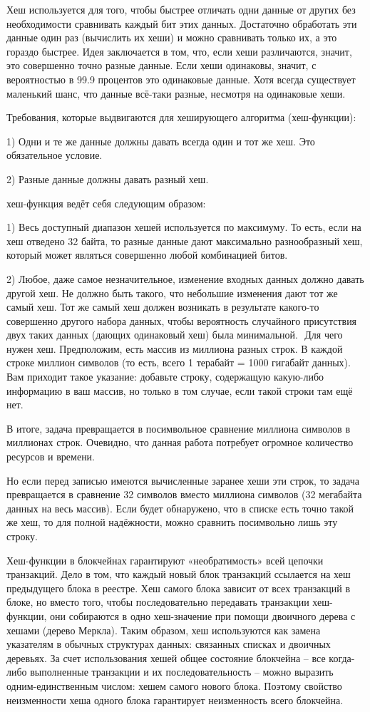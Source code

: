 \documentclass[och, master, nir]{SCWorks_fix}
\theoremstyle{plain}
\theoremstyle{plain}
\theoremstyle{plain}
\theoremstyle{definition}
\begin{document}
Хеш используется для того, чтобы быстрее отличать одни данные от других без необходимости сравнивать каждый бит этих данных. Достаточно обработать эти данные один раз (вычислить их хеши) и можно сравнивать только их, а это гораздо быстрее. Идея заключается в том, что, если хеши различаются, значит, это совершенно точно разные данные. Если хеши одинаковы, значит, с вероятностью в 99.9 процентов это одинаковые данные. Хотя всегда существует маленький шанс, что данные всё-таки разные, несмотря на одинаковые хеши.

Требования, которые выдвигаются для хеширующего алгоритма (хеш-функции):

1) Одни и те же данные должны давать всегда один и тот же хеш. Это обязательное условие.

2) Разные данные должны давать разный хеш. 

 хеш-функция ведёт себя следующим образом:

1) Весь доступный диапазон хешей используется по максимуму. То есть, если на хеш отведено 32 байта, то разные данные дают максимально разнообразный хеш, который может являться совершенно любой комбинацией битов. 

2) Любое, даже самое незначительное, изменение входных данных должно давать другой хеш. Не должно быть такого, что небольшие изменения дают тот же самый хеш. Тот же самый хеш должен возникать в результате какого-то совершенно другого набора данных, чтобы вероятность случайного присутствия двух таких данных (дающих одинаковый хеш) была минимальной.  	
Для чего нужен хеш. Предположим, есть массив из миллиона разных строк. В каждой строке миллион символов (то есть, всего 1 терабайт = 1000 гигабайт данных). Вам приходит такое указание: добавьте строку, содержащую какую-либо информацию в ваш массив, но только в том случае, если такой строки там ещё нет.

В итоге, задача превращается в посимвольное сравнение миллиона символов в миллионах строк. Очевидно, что данная работа потребует огромное количество ресурсов и времени.

Но если перед записью имеются вычисленные заранее хеши эти строк, то задача превращается в сравнение 32 символов вместо миллиона символов (32 мегабайта данных на весь массив). Если будет обнаружено, что в списке есть точно такой же хеш, то для полной надёжности, можно сравнить посимвольно лишь эту строку. 

Хеш-функции в блокчейнах гарантируют «необратимость» всей цепочки транзакций. Дело в том, что каждый новый блок транзакций ссылается на хеш предыдущего блока в реестре. Хеш самого блока зависит от всех транзакций в блоке, но вместо того, чтобы последовательно передавать транзакции хеш-функции, они собираются в одно хеш-значение при помощи двоичного дерева с хешами (дерево Меркла). Таким образом, хеш используются как замена указателям в обычных структурах данных: связанных списках и двоичных деревьях. За счет использования хешей общее состояние блокчейна – все когда-либо выполненные транзакции и их последовательность – можно выразить одним-единственным числом: хешем самого нового блока. Поэтому свойство неизменности хеша одного блока гарантирует неизменность всего блокчейна.\cite{bib:block:2}
\end{document}
